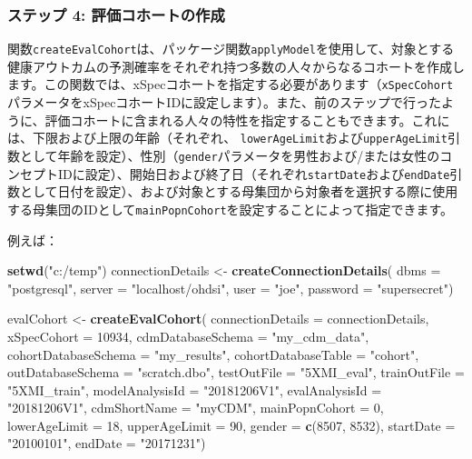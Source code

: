 \documentclass[
  11pt]{book}
\newenvironment{Shaded}{\begin{snugshade}}{\end{snugshade}}
\newcommand{\AttributeTok}[1]{\textcolor[rgb]{0.13,0.29,0.53}{#1}}
\newcommand{\DecValTok}[1]{\textcolor[rgb]{0.00,0.00,0.81}{#1}}
\newcommand{\FunctionTok}[1]{\textcolor[rgb]{0.13,0.29,0.53}{\textbf{#1}}}
\newcommand{\NormalTok}[1]{#1}
\newcommand{\OtherTok}[1]{\textcolor[rgb]{0.56,0.35,0.01}{#1}}
\newcommand{\StringTok}[1]{\textcolor[rgb]{0.31,0.60,0.02}{#1}}
\theoremstyle{definition}
\theoremstyle{definition}
\theoremstyle{definition}
\theoremstyle{definition}
\theoremstyle{remark}
\begin{document}
\subsubsection*{ステップ 4: 評価コホートの作成}\label{ux30b9ux30c6ux30c3ux30d7-4-ux8a55ux4fa1ux30b3ux30dbux30fcux30c8ux306eux4f5cux6210}

関数\texttt{createEvalCohort}は、パッケージ関数\texttt{applyModel}を使用して、対象とする健康アウトカムの予測確率をそれぞれ持つ多数の人々からなるコホートを作成します。この関数では、xSpecコホートを指定する必要があります（\texttt{xSpecCohort}パラメータをxSpecコホートIDに設定します）。また、前のステップで行ったように、評価コホートに含まれる人々の特性を指定することもできます。これには、下限および上限の年齢（それぞれ、 \texttt{lowerAgeLimit}および\texttt{upperAgeLimit}引数として年齢を設定）、性別（\texttt{gender}パラメータを男性および/または女性のコンセプトIDに設定）、開始日および終了日（それぞれ\texttt{startDate}および\texttt{endDate}引数として日付を設定）、および対象とする母集団から対象者を選択する際に使用する母集団のIDとして\texttt{mainPopnCohort}を設定することによって指定できます。

例えば：

\begin{Shaded}
\begin{Highlighting}[]
\FunctionTok{setwd}\NormalTok{(}\StringTok{"c:/temp"}\NormalTok{)}
\NormalTok{connectionDetails }\OtherTok{\textless{}{-}} \FunctionTok{createConnectionDetails}\NormalTok{(}
  \AttributeTok{dbms =} \StringTok{"postgresql"}\NormalTok{,}
  \AttributeTok{server =} \StringTok{"localhost/ohdsi"}\NormalTok{,}
  \AttributeTok{user =} \StringTok{"joe"}\NormalTok{,}
  \AttributeTok{password =} \StringTok{"supersecret"}\NormalTok{)}

\NormalTok{evalCohort }\OtherTok{\textless{}{-}} \FunctionTok{createEvalCohort}\NormalTok{(}
  \AttributeTok{connectionDetails =}\NormalTok{ connectionDetails,}
  \AttributeTok{xSpecCohort =} \DecValTok{10934}\NormalTok{,}
  \AttributeTok{cdmDatabaseSchema =} \StringTok{"my\_cdm\_data"}\NormalTok{,}
  \AttributeTok{cohortDatabaseSchema =} \StringTok{"my\_results"}\NormalTok{,}
  \AttributeTok{cohortDatabaseTable =} \StringTok{"cohort"}\NormalTok{,}
  \AttributeTok{outDatabaseSchema =} \StringTok{"scratch.dbo"}\NormalTok{,}
  \AttributeTok{testOutFile =} \StringTok{"5XMI\_eval"}\NormalTok{,}
  \AttributeTok{trainOutFile =} \StringTok{"5XMI\_train"}\NormalTok{,}
  \AttributeTok{modelAnalysisId =} \StringTok{"20181206V1"}\NormalTok{,}
  \AttributeTok{evalAnalysisId =} \StringTok{"20181206V1"}\NormalTok{,}
  \AttributeTok{cdmShortName =} \StringTok{"myCDM"}\NormalTok{,}
  \AttributeTok{mainPopnCohort =} \DecValTok{0}\NormalTok{,}
  \AttributeTok{lowerAgeLimit =} \DecValTok{18}\NormalTok{,}
  \AttributeTok{upperAgeLimit =} \DecValTok{90}\NormalTok{,}
  \AttributeTok{gender =} \FunctionTok{c}\NormalTok{(}\DecValTok{8507}\NormalTok{, }\DecValTok{8532}\NormalTok{),}
  \AttributeTok{startDate =} \StringTok{"20100101"}\NormalTok{,}
  \AttributeTok{endDate =} \StringTok{"20171231"}\NormalTok{)}
\end{Highlighting}
\end{Shaded}
\end{document}
